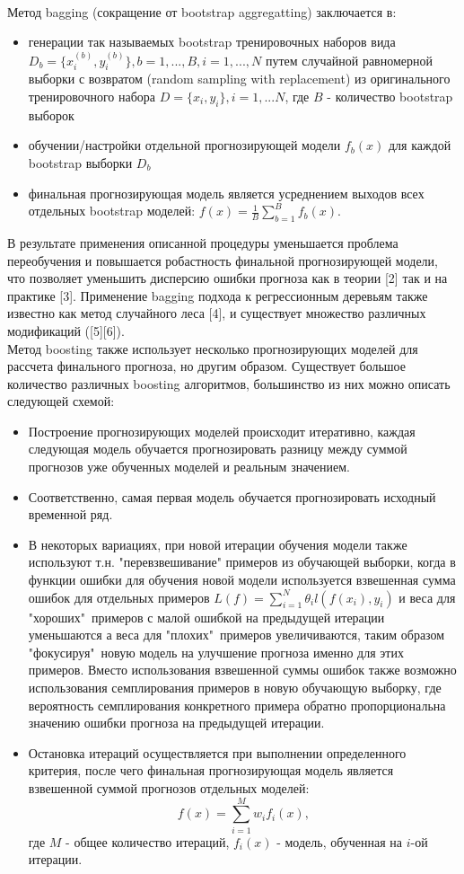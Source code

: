 \documentclass[11pt]{article}
\begin{document}
\\
Метод bagging (сокращение от bootstrap aggregatting) заключается в:
\begin{itemize}
\item генерации так называемых bootstrap тренировочных наборов вида $ D_b = \{x^{(b)}_i, y^{(b)}_i\}, b=1,...,B, i=1,...,N $ путем случайной равномерной выборки с возвратом (random sampling with replacement) из оригинального тренировочного набора $D=\{x_i, y_i\}, i=1,...N$, где $B$ - количество bootstrap выборок
\item обучении/настройки отдельной прогнозирующей модели $f_b(x)$ для каждой bootstrap выборки $D_b$
\item финальная прогнозирующая модель является усреднением выходов всех отдельных bootstrap моделей: $f(x) = \frac{1}{B}\sum_{b=1}^{B}{f_b(x)}$.
\end{itemize}
В результате применения описанной процедуры уменьшается проблема переобучения и повышается робастность финальной прогнозирующей модели, что позволяет уменьшить дисперсию ошибки прогноза как в теории [2] так и на практике [3]. Применение bagging подхода к регрессионным деревьям также известно как метод случайного леса [4], и существует множество различных модификаций ([5][6]).
\\
Метод boosting также использует несколько прогнозирующих моделей для рассчета финального прогноза, но другим образом. Существует большое количество различных boosting алгоритмов, большинство из них можно описать следующей схемой:
\begin{itemize}
\item Построение прогнозирующих моделей происходит итеративно, каждая следующая модель обучается прогнозировать разницу между суммой прогнозов уже обученных моделей и реальным значением.
\item Соответственно, самая первая модель обучается прогнозировать исходный временной ряд.
\item В некоторых вариациях, при новой итерации обучения модели также используют т.н. "перевзвешивание" примеров из обучающей выборки, когда в функции ошибки для обучения новой модели используется взвешенная сумма ошибок для отдельных примеров $L(f) = \sum_{i=1}^{N}{\theta_il(f(x_i), y_i)}$ и веса для "хороших"\ примеров с малой ошибкой на предыдущей итерации уменьшаются а веса для "плохих"\ примеров увеличиваются, таким образом "фокусируя"\ новую модель на улучшение прогноза именно для этих примеров. Вместо использования взвешенной суммы ошибок также возможно использования семплирования примеров в новую обучающую выборку, где вероятность семплирования конкретного примера обратно пропорциональна значению ошибки прогноза на предыдущей итерации.
\item Остановка итераций осуществляется при выполнении определенного критерия, после чего финальная прогнозирующая модель является взвешенной суммой прогнозов отдельных моделей:
$$ f(x) = \sum_{i=1}^{M}{w_if_i(x)}, $$
где $M$ - общее количество итераций, $ f_i(x) $ - модель, обученная на $i$-ой итерации.
\end{itemize}
\end{document}

